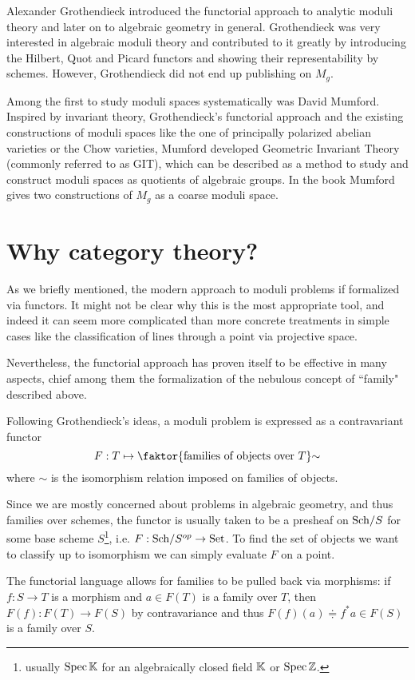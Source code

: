 Alexander Grothendieck introduced the functorial approach to analytic moduli theory and later on to algebraic geometry in general. Grothendieck was very interested in algebraic moduli theory and contributed to it greatly by introducing the Hilbert, Quot and Picard functors and showing their representability by schemes. However, Grothendieck did not end up publishing on $M_g$.\medskip

Among the first to study moduli spaces systematically was David Mumford. Inspired by invariant theory, Grothendieck's functorial approach and the existing constructions of moduli spaces like the one of principally polarized
abelian varieties or the Chow varieties, Mumford developed Geometric Invariant Theory (commonly referred to as GIT), which can be described as a method to study and construct moduli spaces as quotients of algebraic groups. In the book \cite{mumford1994geometric} Mumford gives two constructions of $M_g$ as a coarse moduli space.

\section*{Why category theory?}
As we briefly mentioned, the modern approach to moduli problems if formalized via functors. It might not be clear why this is the most appropriate tool, and indeed it can seem more complicated than more concrete treatments in simple cases like the classification of lines through a point via projective space.\medskip

Nevertheless, the functorial approach has proven itself to be effective in many aspects, chief among them the formalization of the nebulous concept of ``family" described above.\bigskip

Following Grothendieck's ideas, a moduli problem is expressed as a contravariant functor
\[F:T\mapsto \quot{\cpa{\text{families of objects over $T$}}}\sim\]
where $\sim$ is the isomorphism relation imposed on families of objects.

Since we are mostly concerned about problems in algebraic geometry, and thus families over schemes, the functor is usually taken to be a presheaf on ${\mathrm{Sch}}/{S}$ for some base scheme $S$\footnote{usually $\mathrm{Spec}\, \mathbb{K}$ for an algebraically closed field $\mathbb{K}$ or $\mathrm{Spec}\, \mathbb{Z}$.}, i.e. $F:{\mathrm{Sch}}/{S}^{op}\to\mathrm{Set}$.
To find the set of objects we want to classify up to isomorphism we can simply evaluate $F$ on a point.

The functorial language allows for families to be pulled back via morphisms: if $f:S\to T$ is a morphism and $a\in F(T)$ is a family over $T$, then $F(f):F(T)\to F(S)$ by contravariance and thus $F(f)(a)\doteqdot f^\ast a\in F(S)$ is a family over $S$.
\medskip


